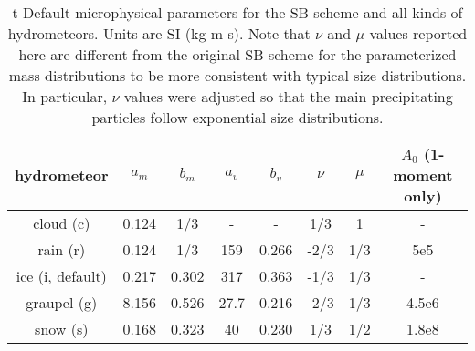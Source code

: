 \documentclass[12pt,A4,french]{article}
\begin{document}
\begin{description}
\begin{table}[!h]
\begin{center}
\begin{tabular}{c|ccccccc}
hydrometeor & $a_m$ & $b_m$ & $a_{v}$ & $b_{v}$ & $\nu$ & $\mu$ & $A_0$ (1-moment only) \\
\hline
cloud (c) & 0.124 & 1/3 & - & - & 1/3 & 1 & - \\
rain (r) & 0.124 & 1/3 & 159 & 0.266 & -2/3 & 1/3 & 5e5 \\
ice (i, default) & 0.217 & 0.302 & 317 & 0.363 & -1/3 & 1/3 & - \\
graupel (g) & 8.156 & 0.526 & 27.7 & 0.216 & -2/3 & 1/3 & 4.5e6 \\
snow (s) & 0.168 & 0.323 & 40 & 0.230 & 1/3 & 1/2 & 1.8e8 \\
\end{tabular}
\end{center}
\caption{t Default microphysical parameters for the SB scheme and all kinds of hydrometeors. Units are SI (kg-m-s). Note that $\nu$ and $\mu$ values reported here are different from the original SB scheme for the parameterized mass distributions to be more consistent with typical size distributions. In particular, $\nu$ values were adjusted so that the main precipitating particles follow exponential size distributions.}
\label{micro_param}
\end{table}


\end{description}
\end{document}
